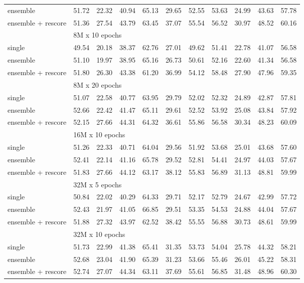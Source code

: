 \documentclass[11pt]{article}
\begin{document}
\begin{multicols}{2}
\begin{table}[H]
\begin{tabular}{@{\extracolsep{2.5pt}}l ccc|ccc|ccc|c@{}}
			ensemble
			& 51.72 & 22.32 & 40.94 & 65.13 & 29.65 & 52.55 & 53.63 & 24.99 & 43.63 & 57.78 \\
			ensemble + rescore
			& 51.36 & 27.54 & 43.79 & 63.45 & 37.07 & 55.54 & 56.52 & 30.97 & 48.52 & 60.16 \\
			\hline
			& \multicolumn{10}{l}{8M x 10 epochs} \\
			single
			& 49.54 & 20.18 & 38.37 & 62.76 & 27.01 & 49.62 & 51.41 & 22.78 & 41.07 & 56.58 \\
			ensemble
			& 51.10 & 19.97 & 38.95 & 65.16 & 26.73 & 50.61 & 52.16 & 22.60 & 41.34 & 56.58 \\
			ensemble + rescore
			& 51.80 & 26.30 & 43.38 & 61.20 & 36.99 & 54.12 & 58.48 & 27.90 & 47.96 & 59.35 \\
			\hline
			& \multicolumn{10}{l}{8M x 20 epochs} \\
			single
			& 51.07 & 22.58 & 40.77 & 63.95 & 29.79 & 52.02 & 52.32 & 24.89 & 42.87 & 57.81 \\
			ensemble
			& 52.66 & 22.42 & 41.47 & 65.11 & 29.61 & 52.52 & 53.92 & 25.08 & 43.84 & 57.92 \\
			ensemble + rescore
			& 52.15 & 27.66 & 44.31 & 64.32 & 36.61 & 55.86 & 56.58 & 30.34 & 48.23 & 60.09 \\
			\hline
			& \multicolumn{10}{l}{16M x 10 epochs} \\
			single
			& 51.26 & 22.33 & 40.71 & 64.04 & 29.56 & 51.92 & 53.68 & 25.01 & 43.68 & 57.60 \\
			ensemble
			& 52.41 & 22.14 & 41.16 & 65.78 & 29.52 & 52.81 & 54.41 & 24.97 & 44.03 & 57.67 \\
			ensemble + rescore
			& 51.83 & 27.66 & 44.12 & 63.17 & 38.12 & 55.83 & 56.89 & 31.13 & 48.81 & 59.99 \\
			\hline
			& \multicolumn{10}{l}{32M x 5 epochs} \\
			single
			& 50.84 & 22.02 & 40.29 & 64.33 & 29.71 & 52.17 & 52.79 & 24.67 & 42.99 & 57.72 \\
			ensemble
			& 52.43 & 21.97 & 41.05 & 66.85 & 29.51 & 53.35 & 54.53 & 24.88 & 44.04 & 57.67 \\
			ensemble + rescore
			& 51.88 & 27.32 & 43.97 & 62.52 & 38.42 & 55.55 & 56.88 & 30.73 & 48.61 & 59.99 \\
			\hline
			& \multicolumn{10}{l}{32M x 10 epochs} \\
			single
			& 51.73 & 22.99 & 41.38 & 65.41 & 31.35 & 53.73 & 54.04 & 25.78 & 44.32 & 58.21 \\
			ensemble
			& 52.68 & 23.04 & 41.90 & 65.39 & 31.23 & 53.66 & 55.46 & 26.01 & 45.22 & 58.31 \\
			ensemble + rescore
			& 52.74 & 27.07 & 44.34 & 63.11 & 37.69 & 55.61 & 56.85 & 31.48 & 48.96 & 60.30 \\
			\hline
		\end{tabular}
	\end{table}


\end{multicols}
\end{document}
